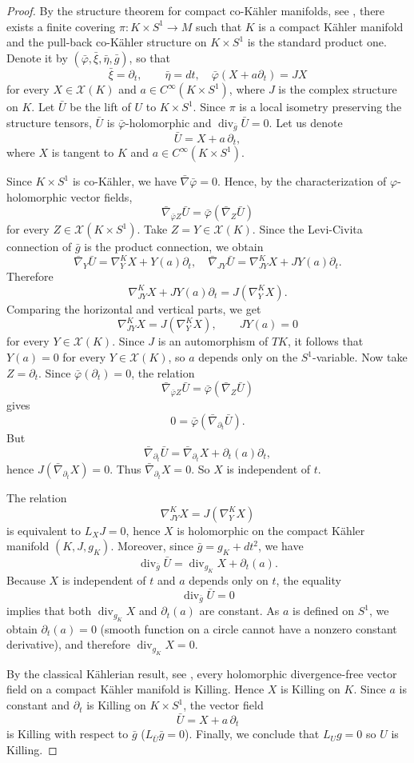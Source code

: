 \documentclass[12pt,a4paper,final]{amsart}
\numberwithin{equation}{section}
\theoremstyle{df}
\newcommand{\X}{\mathcal{X}}
\newcommand{\Cniesk}{{C^\infty}}
\begin{document}
\begin{proof}
By the structure theorem for compact co-K\"ahler manifolds, see \cite{BO},
there exists a finite covering $\pi:K\times S^1\to M$
such that $K$ is a compact K\"ahler manifold and the pull-back co-K\"ahler
structure on $K\times S^1$ is the standard product one. Denote it by $(\bar\varphi,\bar\xi,\bar\eta,\bar g)$,
so that
$$
\bar\xi=\partial_t,\qquad \bar\eta=dt, \quad \bar\varphi(X+a\partial_t)=JX
$$
for every $X\in\X(K)$ and $a\in\Cniesk(K\times S^1)$, where $J$ is the complex
structure on $K$.
Let $\bar U$ be the lift of $U$ to $K\times S^1$. Since $\pi$ is a local
isometry preserving the structure tensors, $\bar U$ is $\bar\varphi$-holomorphic
and $\operatorname{div}_{\bar g}\bar U=0$.
Let us denote
$$
\bar U=X+a\,\partial_t,
$$
where $X$ is tangent to $K$ and $a\in\Cniesk(K\times S^1)$.
\par Since $K\times S^1$ is co-K\"ahler, we have $\bar\nabla\bar\varphi=0$.
Hence, by the characterization of $\varphi$-holomorphic vector fields,
$$
\bar\nabla_{\bar\varphi Z}\bar U=\bar\varphi(\bar\nabla_Z\bar U)
$$
for every $Z\in\X(K\times S^1)$.
Take $Z=Y\in\X(K)$. Since the Levi-Civita connection of $\bar g$ is the product
connection, we obtain
$$
\bar\nabla_Y\bar U=\nabla^K_YX+Y(a)\partial_t,\quad \bar\nabla_{JY}\bar U=\nabla^K_{JY}X+JY(a)\partial_t.
$$
Therefore
$$
\nabla^K_{JY}X+JY(a)\partial_t=J(\nabla^K_YX).
$$
Comparing the horizontal and vertical parts, we get
$$
\nabla^K_{JY}X=J(\nabla^K_YX),
\qquad
JY(a)=0
$$
for every $Y\in\X(K)$. Since $J$ is an automorphism of $TK$, it follows that $Y(a)=0$
for every $Y\in\X(K)$, so $a$ depends only on the $S^1$-variable.
Now take $Z=\partial_t$.
Since $\bar\varphi(\partial_t)=0$,
the relation
$$
\bar\nabla_{\bar\varphi Z}\bar U=\bar\varphi(\bar\nabla_Z\bar U)
$$
gives
$$
0=\bar\varphi(\bar\nabla_{\partial_t}\bar U).
$$
But
$$
\bar\nabla_{\partial_t}\bar U=\bar\nabla_{\partial_t}X+\partial_t(a)\partial_t,
$$
hence $J(\bar\nabla_{\partial_t}X)=0$.
Thus $\bar\nabla_{\partial_t}X=0$.
So $X$ is independent of $t$.
\par The relation
$$
\nabla^K_{JY}X=J(\nabla^K_YX)
$$
is equivalent to $L_XJ=0$,
hence $X$ is holomorphic on the compact K\"ahler manifold $(K,J,g_K)$.
Moreover, since $\bar g=g_K+dt^2$, we have
$$
\operatorname{div}_{\bar g}\bar U=\operatorname{div}_{g_K}X+\partial_t(a).
$$
Because $X$ is independent of $t$ and $a$ depends only on $t$, the equality
$$
\operatorname{div}_{\bar g}\bar U=0
$$
implies that both $\operatorname{div}_{g_K}X$ and $\partial_t(a)$ are constant.
As $a$ is defined on $S^1$, we obtain $\partial_t(a)=0$ (smooth function on a circle cannot have a nonzero constant derivative),
and therefore $\operatorname{div}_{g_K}X=0$.
\par By the classical K\"ahlerian result, see \cite[Theorem 4.81]{Ba}, every
holomorphic divergence-free vector field on a compact K\"ahler manifold is
Killing. Hence $X$ is Killing on $K$. Since $a$ is constant and $\partial_t$ is
Killing on $K\times S^1$, the vector field
$$
\bar U=X+a\,\partial_t
$$
is Killing with respect to $\bar g$ ($L_{\bar U}\bar g=0$).
Finally, we conclude that
$L_Ug=0$ so $U$ is Killing.
\end{proof}
\end{document}
